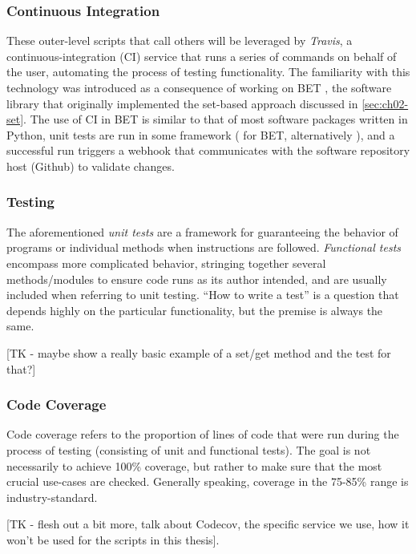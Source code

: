 \subsubsection{Continuous Integration}\label{sec:continuous-integration}
These outer-level scripts that call others will be leveraged by \emph{Travis}, a continuous-integration (CI) service that runs a series of commands on behalf of the user, automating the process of testing functionality.
The familiarity with this technology was introduced as a consequence of working on BET \cite{pyBET}, the software library that originally implemented the set-based approach discussed in \ref{sec:ch02-set}.
The use of CI in BET is similar to that of most software packages written in Python, unit tests are run in some framework ( for BET, alternatively ), and a successful run triggers a webhook that communicates with the software repository host (Github) to validate changes.

\subsubsection{Testing}\label{sec:unit-testing}
The aforementioned \emph{unit tests} are a framework for guaranteeing the behavior of programs or individual methods when instructions are followed.
\emph{Functional tests} encompass more complicated behavior, stringing together several methods/modules to ensure code runs as its author intended, and are usually included when referring to unit testing. 
``How to write a test'' is a question that depends highly on the particular functionality, but the premise is always the same.

[TK - maybe show a really basic example of a set/get method and the test for that?]


\subsubsection{Code Coverage}\label{sec:code-coverage}
Code coverage refers to the proportion of lines of code that were run during the process of testing (consisting of unit and functional tests).
The goal is not necessarily to achieve 100\% coverage, but rather to make sure that the most crucial use-cases are checked.
Generally speaking, coverage in the 75-85\% range is industry-standard.

[TK - flesh out a bit more, talk about Codecov, the specific service we use, how it won't be used for the scripts in this thesis].

